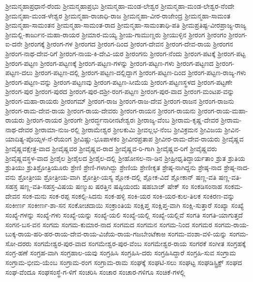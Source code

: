 {ಶ್ರೀಮನ್ಮಹಾಪ್ರಧಾನೆ-ರೆಂದು
ಶ್ರೀಮನ್ಮಹಾಪ್ರಭು
ಶ್ರೀಮನ್ಮಹಾ-ಮಂಡ-ಲೇಶ್ವರ
ಶ್ರೀಮನ್ಮಹಾ-ಮಂಡ-ಲೇಶ್ವರ-ನೆಂದೇ
ಶ್ರೀಮನ್ಮಹಾ-ಮಂಡ-ಳೇಶ್ವರ
ಶ್ರೀಮನ್ಮಹಾ-ರಾಜಾಧಿ-ರಾಜ
ಶ್ರೀಮನ್ಮಹಾ-ವೀರ-ರಾಜೇಂದ್ರ
ಶ್ರೀಮನ್ಮಹಾ-ಸಾಮಂತ
ಶ್ರೀಮನ್ಮಹಾ-ಸಾಮಂತನ
ಶ್ರೀಮನ್ಮಹಾ-ಸಾಮಂತ-ರಾದ
ಶ್ರೀಮನ್ಮಹಾ-ಸಾಮಂತಾಧಿ-ಪತಿ
ಶ್ರೀಮಪ್ರತಿಷ್ಟ-ವೀರಪ್ರಾಜ್ಯ-ರಾಜ್ಯ
ಶ್ರೀಮಲ್ಲಿ-ಕಾರ್ಜುನ-ಮಹಾ-ರಾಯರ
ಶ್ರೀಮಾರ-ಮಯ್ಯ
ಶ್ರೀಯ-ಗಾಮುಣ್ಡರು
ಶ್ರೀಯುಳ್ಳಿನ
ಶ್ರೀರಂಗ
ಶ್ರೀರಂಗಂ
ಶ್ರೀರಂಗ-ಐ-ದನೇ
ಶ್ರೀರಂಗಕ್ಕೆ
ಶ್ರೀರಂಗ-ಗಳ
ಶ್ರೀರಂಗದ
ಶ್ರೀರಂಗ-ದಿಂದ
ಶ್ರೀರಂಗ-ದೇವನ
ಶ್ರೀರಂಗ-ದೇವ-ರಾಯ
ಶ್ರೀರಂಗನ
ಶ್ರೀರಂಗ-ನಾಥ-ದೇವ-ರಿಗೆ
ಶ್ರೀರಂಗ-ನಾಯ-ಕಿ-ದೇವಿ-ಯರ
ಶ್ರೀರಂಗನು
ಶ್ರೀರಂಗ-ನೆಂದು
ಶ್ರೀರಂಗ-ಪಟಕ್ಕೆ
ಶ್ರೀರಂಗ-ಪಟ್ಟ
ಶ್ರೀರಂಗ-ಪಟ್ಟಣ
ಶ್ರೀರಂಗ-ಪಟ್ಟಣಕ್ಕೆ
ಶ್ರೀರಂಗ-ಪಟ್ಟಣ-ಗಳನ್ನು
ಶ್ರೀರಂಗ-ಪಟ್ಟಣ-ಗಳು
ಶ್ರೀರಂಗ-ಪಟ್ಟಣದ
ಶ್ರೀರಂಗ-ಪಟ್ಟಣ-ದಲು
ಶ್ರೀರಂಗ-ಪಟ್ಟಣ-ದಲ್ಲಿ
ಶ್ರೀರಂಗ-ಪಟ್ಟಣ-ದಲ್ಲಿದ್ದಾಗ
ಶ್ರೀರಂಗ-ಪಟ್ಟಣ-ದಿಂದ
ಶ್ರೀರಂಗ-ಪಟ್ಟಣ-ರಾಜ್ಯ-ಗಳು
ಶ್ರೀರಂಗ-ಪಟ್ಟಣ-ವನ್ನು
ಶ್ರೀರಂಗ-ಪಟ್ಟಣವು
ಶ್ರೀರಂಗ-ಪಟ್ಟಣ-ಸೀಮೆಯ
ಶ್ರೀರಂಗ-ಪಟ್ಟಣಸ್ಥಳದ
ಶ್ರೀರಂಗ-ಪಟ್ಟಣೇ
ಶ್ರೀರಂಗ-ಪುರ
ಶ್ರೀರಂಗ-ಪುರದ
ಶ್ರೀರಂಗ-ಪುರ-ದಶ್ರೀ-ರಂಗ-ಪಟ್ಟಣ
ಶ್ರೀರಂಗ-ಪುರ-ವಾದ
ಶ್ರೀರಂಗ-ಮಂಟಪ-ವನ್ನು
ಶ್ರೀರಂಗ-ಮಹಾ-ರಾಯರು
ಶ್ರೀರಂಗಮ್
ಶ್ರೀರಂಗ-ರಾಜ
ಶ್ರೀರಂಗ-ರಾಜ-ದೇವ
ಶ್ರೀರಂಗ-ರಾಜನ
ಶ್ರೀರಂಗ-ರಾಜನು
ಶ್ರೀರಂಗ-ರಾಮ-ದೇವ-ರಾಯ
ಶ್ರೀರಂಗ-ರಾಯ-ದೇವರು
ಶ್ರೀರಂಗ-ರಾಯನ
ಶ್ರೀರಂಗ-ರಾಯನು
ಶ್ರೀರಂಗ-ರಾಯ-ಮಹಾ-ರಾಯರು
ಶ್ರೀರಂಗ-ರಾಯರ
ಶ್ರೀರಂಗೇ
ಶ್ರೀರರ್ದ್ಧನಾರೀನಟೇಶ್ವರಃ
ಶ್ರೀರಾಜ್ಯ-ವೆಂಬ
ಶ್ರೀರಾಮ-ಕೃಷ್ಣ-ದೇವರ
ಶ್ರೀರಾಮ-ನಾಥ-ದೇವರ
ಶ್ರೀರಾಮಾ-ನುಜ-ರಲ್ಲಿ
ಶ್ರೀರಾಮೇಶ್ವರ
ಶ್ರೀಲಕುಮಿ
ಶ್ರೀವಲ್ಲಭ-ನೆಂಬ
ಶ್ರೀವಿಕ್ರಮನ
ಶ್ರೀವಿಜಯ
ಶ್ರೀವಿನ-ಯಾದಿತ್ಯ-ಪೊಯ್ಸಳ-ನೆ-ರೆಯಂಗ
ಶ್ರೀವಿಷ್ಣು-ಭೂಪಾಳಕಂ
ಶ್ರೀವೀರಪ್ರತಾಪ
ಶ್ರೀವೀರ-ರಾಮ-ದೇವ-ರಾಯರು
ಶ್ರೀವೈಷ್ಣವ
ಶ್ರೀವೈಷ್ಣವಕ್ಷೇತ್ರ-ವಾದ
ಶ್ರೀವೈಷ್ಣವರ
ಶ್ರೀವೈಷ್ಣವ-ರಾದ
ಶ್ರೀವೈಷ್ಣವ-ರಿ-ಗಾಗಿ
ಶ್ರೀವೈಷ್ಣವ-ರಿಗೆ
ಶ್ರೀವೈಷ್ಣವರು
ಶ್ರೀವೈಷ್ಣವಸ್ಥಳ-ವಾದ
ಶ್ರೀಶೈಲ
ಶ್ರೀಶೈಲದ
ಶ್ರೀಶೈಲ-ದಲ್ಲಿ
ಶ್ರೀಹೋಸಲ-ನಾ-ಡಿನ
ಶ್ರೀಹ್ರೀಧೃತಿದ್ಧಾರ್ಯತಾಂ
ಶ್ರುತ
ಶ್ರುತಿಯ
ಶ್ರುತಿಯು
ಶ್ರುತಿಶ್ರೋತ್ರಿಯೂರು
ಶ್ರೇಣಿ
ಶ್ರೇಣಿ-ಗಳಾಗಿದ್ದು
ಶ್ರೇಣಿಯ
ಶ್ರೇಣೀಕೃತ
ಶ್ರೇಷ್ಠ-ನಾಗಿದ್ದನು
ಶ್ರೇಷ್ಠ-ನಾದ
ಶ್ರೇಷ್ಠ-ನಾದ-ವನು
ಶ್ರೋತ್ರೀಯ
ಶ್ರೋತ್ರೀಯ-ವಾಗಿ
ಶ್ರೋತ್ರೀ-ಯಸ್ಯ
ಶ್ಲೋಕ-ದಲ್ಲಿ
ಶ್ಲೋಕ-ವಿದೆ
ಶ್ಲೋಕಾನ್
ಷಣ್ಣ-ವತಿ
ಷಣ್ಣ-ವತಿ-ಸಹಸ್ರ
ಷಣ್ಣ-ವತಿ-ಸಹಸ್ರ-ವಿಷಯ
ಷಣ್ಮುಖ
ಷರತ್ತಿನ
ಷಷ್ಠಿಯಂದು
ಷಹಬಾಜ್
ಷೇಕ್
ಸಂ
ಸಂಕಡಿಸಂನಾಹ
ಸಂಕಮ-ದೇವನ
ಸಂಕ-ಮನು
ಸಂಕ-ರಪ್ಪ
ಸಂಕಲ್ಪಿ-ಸಿದನು
ಸಂಕ-ಹಳ್ಳಿ
ಸಂಕಿ-ಯರ
ಸಂಕಿ-ಯರ-ಕುಲ-ತಿಲಕ
ಸಂಕಿರಣ-ವನ್ನು
ಸಂಕೀರ್ಣ
ಸಂಕೀರ್ಣ-ಶಾ-ಸನ
ಸಂಕೋಚದಾಯಿ
ಸಂಕ್ರಾಂತಿಯ
ಸಂಕ್ಷಿಪ್ತ
ಸಂಕ್ಷಿಪ್ತ-ವಾಗಿ
ಸಂಕ್ಷಿ-ಸುತ್ತಾರೆ
ಸಂಖ್ಯಾ
ಸಂಖ್ಯೆ
ಸಂಖ್ಯೆ-ಗಳನ್ನು
ಸಂಖ್ಯೆ-ಗಳು
ಸಂಖ್ಯೆ-ಯನ್ನು
ಸಂಖ್ಯೆ-ಯಲಿ
ಸಂಖ್ಯೆ-ಯಲ್ಲಿ
ಸಂಖ್ಯೆ-ಯಲ್ಲಿವೆ
ಸಂಗತಿ
ಸಂಗತಿ-ಯಾಗುತ್ತದೆ
ಸಂಗನ-ಬಸ-ವನ
ಸಂಗಮ
ಸಂಗಮ-ಕುಮಾರ-ನಾದ
ಸಂಗಮದ
ಸಂಗಮನ
ಸಂಗಮ-ನಿಂದ
ಸಂಗಮರ
ಸಂಗಮ-ರಾಯ-ಬುಕ್ಕ-ರಾಯ-ಹರಿ-ಹರ-ರಾಯ-ದೇವ-ರಾಯ-ವಿಜೆಯ-ರಾಯ-ಗಜಬೇಂಟೆಕಾಱ
ಸಂಗಮ-ವಂಶಾ-ವಳಿ-ಯನ್ನು
ಸಂಗಮ-ಸೋ-ದರರು
ಸಂಗಮೇಶ್ವರ-ಪುರ-ವಾದ
ಸಂಗಮೇಶ್ವರ-ಪುರ-ವೆಂಬ
ಸಂಗಮೇಶ್ವರ-ರಾಯ
ಸಂಗರಕೆ
ಸಂಗೀತ
ಸಂಗ್ರಹಕ್ಕೆ
ಸಂಗ್ರ-ಹಣೆ
ಸಂಗ್ರಹ-ವಾಗಿ
ಸಂಗ್ರಹಾಲ-ಯವು
ಸಂಗ್ರಹಿಸಿ
ಸಂಗ್ರಹಿಸಿ-ದರು
ಸಂಗ್ರಹಿಸಿದ್ದಾರೆ
ಸಂಗ್ರಹಿ-ಸುವ
ಸಂಗ್ರಾಮ
ಸಂಗ್ರಾಮ-ಭೀಮ-ಯೆಂಬ
ಸಂಗ್ರಾಮ-ರಂಗ
ಸಂಗ್ರಾಮ-ರಾಮ
ಸಂಘಕ್ಕೆ
ಸಂಘಟಿ-ಸಲು
ಸಂಘಟ್ಟ
ಸಂಘಡಿಸ್ಟ್ರಿಕ್ಟ್
ಸಂಘದ
ಸಂಘ-ವೆಂದೂ
ಸಂಘಸಂಸ್ಥೆ-ಗ-ಳಿಗೆ
ಸಂಚರಿಸಿ
ಸಂಚಾರ
ಸಂಚಾರ-ಗಳಿಗೂ
ಸಂಚಿಕೆ-ಗಳಲ್ಲಿ
}
